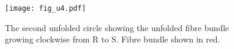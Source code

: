 %

\begin{figure}[!h]
  \centering
  \texttt{[image: fig\_u4.pdf]}
  \caption{The second unfolded circle showing the unfolded fibre bundle growing clockwise from R to S. Fibre bundle shown in red.}
  \label{fig:unf4}
\end{figure}

%

